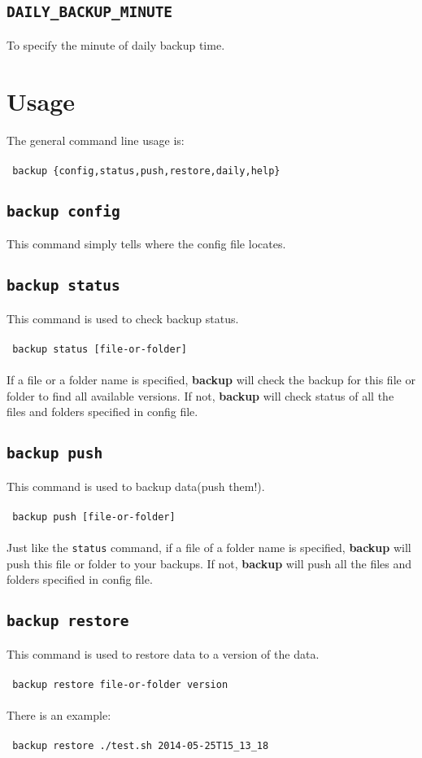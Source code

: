 \documentclass[a4paper]{article}
\begin{document}
\subsection{{\large\tt DAILY\_BACKUP\_MINUTE}}
To specify the minute of daily backup time.

\section{Usage}
The general command line usage is: \\
\\
{\tt
    backup \{config,status,push,restore,daily,help\}
}

\subsection{{\large\tt backup config}}
This command simply tells where the config file locates.

\subsection{{\large\tt backup status}}
This command is used to check backup status. \\
\\
{\tt
    backup status [file-or-folder]
} \\
\\
If a file or a folder name is specified, \textbf{backup} will check the backup for this file or folder to find all available versions. If not, \textbf{backup} will check status of all the files and folders specified in config file.

\subsection{{\large\tt backup push}}
This command is used to backup data(push them!). \\
\\
{\tt
    backup push [file-or-folder]
} \\
\\
Just like the {\large\tt status} command, if a file of a folder name is specified, \textbf{backup} will push this file or folder to your backups. If not, \textbf{backup} will push all the files and folders specified in config file.

\subsection{{\large\tt backup restore}}
This command is used to restore data to a version of the data. \\
\\
{\tt
    backup restore file-or-folder version
} \\
\\
There is an example: \\
\\
{\tt
    backup restore ./test.sh 2014-05-25T15\_13\_18
}
\end{document}
